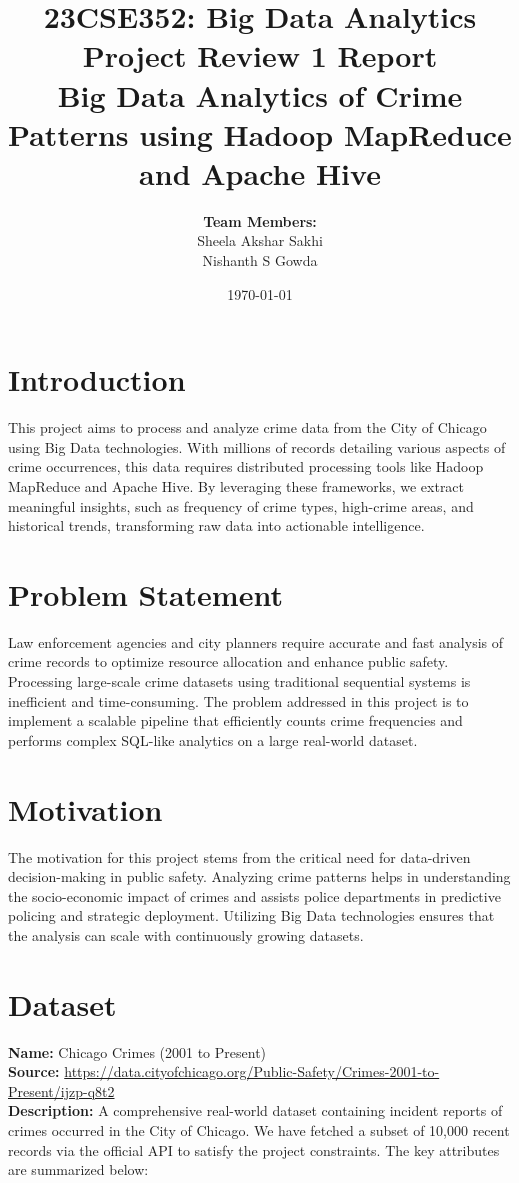 \documentclass[12pt, a4paper]{article}
\title{\textbf{23CSE352: Big Data Analytics}\\ \Large Project Review 1 Report \\ \vspace{0.5cm} \Large \textbf{Big Data Analytics of Crime Patterns using Hadoop MapReduce and Apache Hive}}
\author{\textbf{Team Members:}\\ Sheela Akshar Sakhi \\ Nishanth S Gowda}
\date{\today}
\begin{document}
\maketitle
\tableofcontents
\newpage

\section{Introduction}
This project aims to process and analyze crime data from the City of Chicago using Big Data technologies. With millions of records detailing various aspects of crime occurrences, this data requires distributed processing tools like Hadoop MapReduce and Apache Hive. By leveraging these frameworks, we extract meaningful insights, such as frequency of crime types, high-crime areas, and historical trends, transforming raw data into actionable intelligence.

\section{Problem Statement}
Law enforcement agencies and city planners require accurate and fast analysis of crime records to optimize resource allocation and enhance public safety. Processing large-scale crime datasets using traditional sequential systems is inefficient and time-consuming. The problem addressed in this project is to implement a scalable pipeline that efficiently counts crime frequencies and performs complex SQL-like analytics on a large real-world dataset.

\section{Motivation}
The motivation for this project stems from the critical need for data-driven decision-making in public safety. Analyzing crime patterns helps in understanding the socio-economic impact of crimes and assists police departments in predictive policing and strategic deployment. Utilizing Big Data technologies ensures that the analysis can scale with continuously growing datasets.

\section{Dataset}
\textbf{Name:} Chicago Crimes (2001 to Present)\\
\textbf{Source:} \url{https://data.cityofchicago.org/Public-Safety/Crimes-2001-to-Present/ijzp-q8t2}\\
\textbf{Description:} A comprehensive real-world dataset containing incident reports of crimes occurred in the City of Chicago. We have fetched a subset of 10,000 recent records via the official API to satisfy the project constraints. The key attributes are summarized below:
\end{document}
